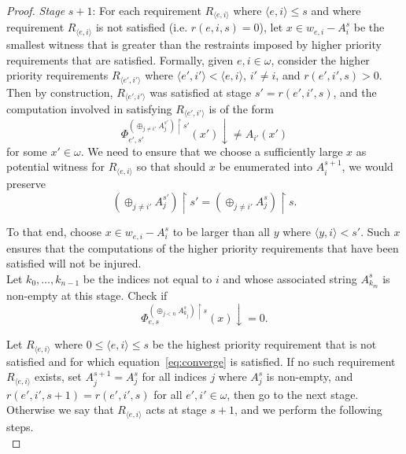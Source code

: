 \documentclass{article}
\begin{document}
\begin{enumerate}[label={(\roman*)}]
\begin{proof}
        \textit{Stage} $s+1$: For each requirement $R_{\langle e,i\rangle}$
        where $\langle e,i\rangle \leq s$ and where requirement $R_{\langle
        e,i\rangle}$ is not satisfied (i.e. $r(e,i,s)=0$), let $x\in
        w_{e,i}-A_i^s$ be the smallest witness that is greater than the
        restraints imposed by higher priority requirements that are
        satisfied. Formally, given $e,i\in\omega$, consider the higher
        priority requirements $R_{\langle e',i'\rangle}$ where
        $\langle e',i'\rangle <\langle e,i\rangle$, $i'\neq i$, and
        $r(e',i',s)>0$. Then by construction, $R_{\langle e',i'\rangle}$
        was satisfied at stage $s'=r(e',i',s)$, and the computation
        involved in satisfying $R_{\langle e',i'\rangle}$ is of the form
        \[\Phi_{e',s'}^{(\oplus_{j\neq i'} A_{j}^{s'}) \restriction s'}
        (x')\downarrow\neq A_{i'}(x')\]
        for some $x'\in\omega$. We need to ensure that we choose a
        sufficiently large $x$ as potential witness for $R_{\langle
        e,i\rangle}$ so that should $x$ be enumerated into $A_i^{s+1}$, we
        would preserve
        \[(\oplus_{j\neq i'} A_{j}^{s'}) \restriction s' =(\oplus_{j\neq
        i'} A_{j}^{s}) \restriction s.\]

        To that end, choose $x\in w_{e,i}-A_i^s$ to be larger than all $y$
        where $\langle y,i\rangle <s'$. Such $x$ ensures that the
        computations of the higher priority requirements that have been
        satisfied will not be injured. \\

        Let $k_0,\ldots,k_{n-1}$ be the indices not equal to $i$ and whose
        associated string $A_{k_m}^s$ is non-empty at this stage. Check if
        \begin{equation}
          \Phi_{e,s}^{(\oplus_{j<n} A_{k_j}^s) \restriction s}(x)
          \downarrow=0.
          \label{eq:converge}
        \end{equation}

        Let $R_{\langle e,i\rangle}$ where $0\leq \langle e,i\rangle \leq
        s$ be the highest priority requirement that is not satisfied and
        for which equation~\eqref{eq:converge} is satisfied. If no such
        requirement $R_{\langle e,i\rangle}$ exists, set
        $A_j^{s+1}=A_j^s$ for all indices $j$ where $A_j^s$ is non-empty,
        and $r(e',i',s+1)=r(e',i',s)$ for all $e',i'\in\omega$,
        then go to the next stage. Otherwise we say that $R_{\langle
        e,i\rangle}$ acts at stage $s+1$, and we perform the following
        steps. \\


\end{proof}
\end{enumerate}
\end{document}
